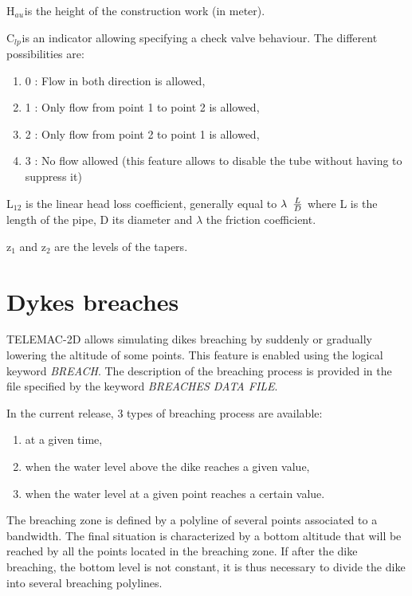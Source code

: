  H${}_{au}$${}_{ }$is the height of the construction work (in meter).

 C${}_{lp}$${}_{ }$is an indicator allowing specifying a check valve behaviour. The different possibilities are:

\begin{enumerate}
\item  [\nonumber] 0 : Flow in both direction is allowed,

\item [\nonumber] 1 : Only flow from point 1 to point 2 is allowed,

\item [\nonumber] 2 : Only flow from point 2 to point 1 is allowed,

\item [\nonumber] 3 : No flow allowed (this feature allows to disable the tube without having to suppress it)
\end{enumerate}

 L${}_{12}$ is the linear head loss coefficient, generally equal to $\lambda {\kern 1pt} {\kern 1pt} {\kern 1pt} {\kern 1pt} {\kern 1pt} \frac{L}{D} $ where L is the length of the pipe, D its diameter and $\lambda$ the friction coefficient.

 z${}_{1}$ and z${}_{2}$ are the levels of the tapers.


\section{ Dykes breaches}

 TELEMAC-2D allows simulating dikes breaching by suddenly or gradually lowering the altitude of some points. This feature is enabled using the logical keyword \textit{BREACH}. The description of the breaching process is provided in the file specified by the keyword \textit{BREACHES DATA FILE}.

 In the current release, 3 types of breaching process are available:

\begin{enumerate}
\item  at a given time,

\item  when the water level above the dike reaches a given value,

\item  when the water level at a given point reaches a certain value.
\end{enumerate}

 The breaching zone is defined by a polyline of several points associated to a bandwidth. The final situation is characterized by a bottom altitude that will be reached by all the points located in the breaching zone. If after the dike breaching, the bottom level is not constant, it is thus necessary to divide the dike into several breaching polylines.

